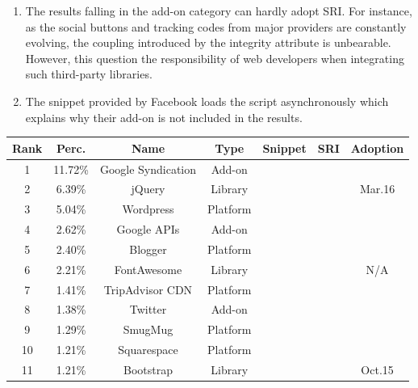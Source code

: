 \documentclass[sigconf,table]{acmart}
\def\yessymbol{\ding{51}}
\begin{document}
\begin{enumerate}
	\item 
		The results falling in the add-on category can hardly adopt SRI.
		For instance, as the social buttons and tracking codes from major providers are constantly evolving, the coupling introduced by the integrity attribute is unbearable.
		However, this question the responsibility of web developers when integrating such third-party libraries.
	\item
		The snippet provided by Facebook loads the script asynchronously which explains why their add-on is not included in the results.
\end{enumerate}


\begin{table}[h]
\begin{tabular}{ccccccc}
\toprule
\textbf{Rank} & \textbf{Perc.}	& \textbf{Name}       & \textbf{Type} & \textbf{Snippet}	& \textbf{SRI}	& \textbf{Adoption} \\ 
\bottomrule
1             & \num{11.72}\%	& Google Syndication  & Add-on        & \yessymbol			&				&                   \\
2             & \num{6.39}\%		& jQuery              & Library       & \yessymbol			& \yessymbol	& Mar.16            \\
3             & \num{5.04}\%		& Wordpress           & Platform      & 						&				&                   \\
4             & \num{2.62}\%		& Google APIs         & Add-on        & \yessymbol			&				&                   \\
5             & \num{2.40}\%		& Blogger             & Platform      & 						& 				&                   \\
6             & \num{2.21}\%		& FontAwesome         & Library       & \yessymbol			& \yessymbol	& N/A				\\
7             & \num{1.41}\% 	& TripAdvisor CDN	  & Platform      & 						&				&                   \\
8             & \num{1.38}\%		& Twitter             & Add-on        & \yessymbol			&				&                   \\
9             & \num{1.29}\%		& SmugMug             & Platform      &						&				&                   \\
10            & \num{1.21}\%		& Squarespace         & Platform      & 						&				&                   \\
11            & \num{1.21}\%		& Bootstrap           & Library       & \yessymbol			& \yessymbol	& Oct.15            \\

\end{tabular}
\end{table}
\end{document}
